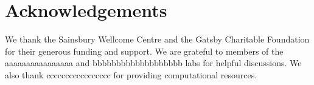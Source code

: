 \section*{Acknowledgements}

We thank the Sainsbury Wellcome Centre and the Gatsby Charitable Foundation for their generous funding and support. We are grateful to members of the aaaaaaaaaaaaaaaa and bbbbbbbbbbbbbbbbbbb labs for helpful discussions. We also thank ccccccccccccccccc for providing computational resources.
